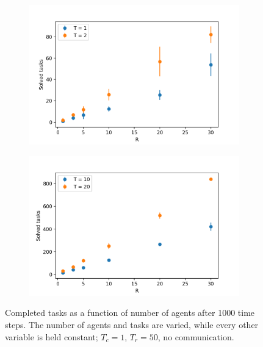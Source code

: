\documentclass[11pt]{article}
\begin{document}
    \begin{figure}
        \centering
        \begin{subfigure}[b]{0.49\textwidth}
            \centering
            \includegraphics[width=\textwidth]{figures/low_T_tasks_vs_R.png}
        \end{subfigure}
        \hfill
        \begin{subfigure}[b]{0.49\textwidth}
            \centering
            \includegraphics[width=\textwidth]{figures/high_T_tasks_vs_R.png}
        \end{subfigure}
        \caption{
            Completed tasks as a function of number of agents after 
            1000 time steps. The number of agents and tasks are varied, 
            while every other variable is held constant; $T_c=1$, $T_r=50$, 
            no communication.
        }
        \label{fig:tasks_vs_R}
    \end{figure}
\end{document}
